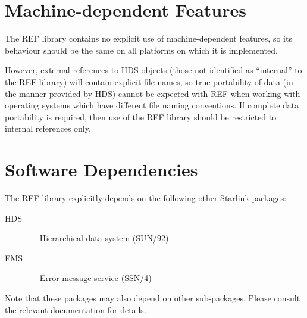 \documentclass[twoside,11pt]{article}
\newcommand{\xref}[3]{#1}
\newcommand{\xlabel}[1]{}
\begin{document}
\section{\xlabel{machinedependent_features}Machine-dependent Features}
\label{machinedependent_features}

The REF library contains no explicit use of machine-dependent features,
so its behaviour should be the same on all platforms on which it is
implemented.

However, external references to HDS objects (those not identified as
``internal'' to the REF library) will contain explicit file names, so
true portability of data (in the manner provided by HDS) cannot be
expected with REF when working with operating systems which have
different file naming conventions. If complete data portability is
required, then use of the REF library should be restricted to internal
references only.

\section{\xlabel{software_dependencies}Software Dependencies}
\label{software_dependencies}

The REF library explicitly depends on the following other Starlink packages:

\begin{description}
\item [HDS] --- Hierarchical data system (\xref{SUN/92}{sun92}{})
\item [EMS] --- Error message service (\xref{SSN/4}{ssn4}{})
\end{description}

Note that these packages may also depend on other sub-packages. Please
consult the relevant documentation for details.

\end{document}
